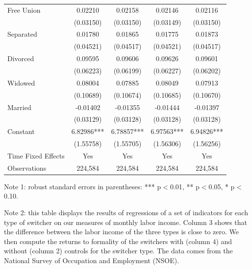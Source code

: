 \documentclass{svjour3}                     %
\begin{document}
\begin{table}[H]
\begin{threeparttable}
\begin{tabular}{lcccc}
Free Union & 0.02210 & 0.02158 & 0.02146 & 0.02116 \\
 & (0.03150) & (0.03150) & (0.03149) & (0.03150) \\
Separated & 0.01780 & 0.01865 & 0.01775 & 0.01873 \\
 & (0.04521) & (0.04517) & (0.04521) & (0.04517) \\
Divorced & 0.09595 & 0.09606 & 0.09626 & 0.09601 \\
 & (0.06223) & (0.06199) & (0.06227) & (0.06202) \\
Widowed & 0.08004 & 0.07885 & 0.08049 & 0.07913 \\
 & (0.10689) & (0.10674) & (0.10685) & (0.10670) \\
Married & -0.01402 & -0.01355 & -0.01444 & -0.01397 \\
 & (0.03129) & (0.03128) & (0.03128) & (0.03128) \\
Constant & 6.82986*** & 6.78857*** & 6.97563*** & 6.94826*** \\
 & (1.55758) & (1.55705) & (1.56306) & (1.56256) \\ \hline
 Time Fixed Effects & Yes &  Yes &  Yes &  Yes \\
Observations & 224,584 & 224,584 & 224,584 & 224,584 \\ \hline \hline
\end{tabular}
\begin{tablenotes}[flushleft]
\tiny
\item Note 1: robust standard errors in parentheses: *** p$<$0.01, ** p$<$0.05, * p$<$0.10.
\item Note 2: this table displays the results of regressions of a set of indicators for each type of switcher on our measures of monthly labor income. Column 3 shows that the difference between the labor income of the three types is close to zero. We then compute the returns to formality of the switchers with (column 4) and without (column 2) controls for the switcher type. The data comes from the National Survey of Occupation and Employment (NSOE).
\end{tablenotes}
\end{threeparttable}
\end{table}
\end{document}
